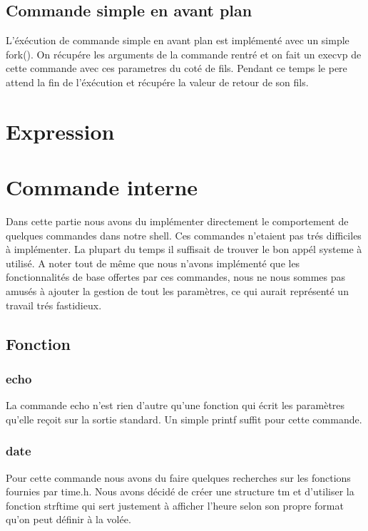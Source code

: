 \documentclass[12pt]{article}
\begin{document}
 \subsection{Commande simple en avant plan}
 
 L'éxécution de commande simple en avant plan est implémenté avec un simple fork().
 On récupére les arguments de la commande rentré et on fait un execvp de cette commande
 avec ces parametres du coté de fils. Pendant ce temps le pere attend la fin de l'éxécution
 et récupére la valeur de retour de son fils.
 
 

\newpage
\section{Expression}


\newpage
\section{Commande interne}

Dans cette partie nous avons du implémenter directement le comportement de quelques
commandes dans notre shell. Ces commandes n'etaient pas trés difficiles à implémenter. La plupart
du temps il suffisait de trouver le bon appél systeme à utilisé. A noter tout de même
que nous n'avons implémenté que les fonctionnalités de base offertes par ces commandes, nous
ne nous sommes pas amusés à ajouter la gestion de tout les paramètres, ce qui aurait 
représenté un travail trés fastidieux.

\subsection{Fonction}
\subsubsection{echo}
 La commande echo n'est rien d'autre qu'une fonction qui écrit les paramètres qu'elle reçoit
 sur la sortie standard. Un simple printf suffit pour cette commande.
 
\subsubsection{date}
 Pour cette commande nous avons du faire quelques recherches sur les fonctions fournies par time.h.
 Nous avons décidé de créer une structure tm et d'utiliser la fonction strftime qui
 sert justement à afficher l'heure selon son propre format qu'on peut définir à la volée.
 
\end{document}
